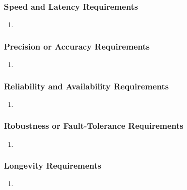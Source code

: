 \documentclass[english]{article}
\begin{document}
\subsubsection{Speed and Latency Requirements}
\label{ssub:speed_and_latency_requirements}
\begin{enumerate}[{SLR}1. ]
\item
\end{enumerate}

\subsubsection{Precision or Accuracy Requirements}
\label{ssub:precision_or_accuracy_requirements}
\begin{enumerate}[{PAR}1. ]
\item
\end{enumerate}

\subsubsection{Reliability and Availability Requirements}
\label{ssub:reliability_and_availability_requirements}
\begin{enumerate}[{RAR}1. ]
\item
\end{enumerate}

\subsubsection{Robustness or Fault-Tolerance Requirements}
\label{ssub:robustness_or_fault_tolerance_requirements}
\begin{enumerate}[{RFR}1. ]
\item
\end{enumerate}

\subsubsection{Longevity Requirements}
\label{ssub:longevity_requirements}
\begin{enumerate}[{LONGR}1. ]
\item
\end{enumerate}

\end{document}
